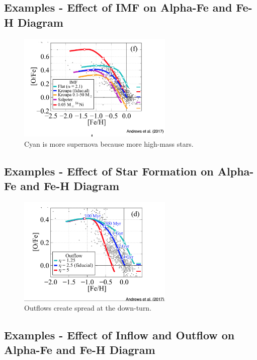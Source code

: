 \documentclass{article}
\begin{document}
\subsection{Examples - Effect of IMF on Alpha-Fe and Fe-H Diagram}

\begin{figure}
    \centering
    \includegraphics[width=0.66\textwidth]{figs/Screen Shot 2021-10-13 at 10.03.33 AM.png}
    \caption{Cyan is more supernova because more high-mass stars.  }
    \label{fig:Examples1}
\end{figure}

\subsection{Examples - Effect of Star Formation on Alpha-Fe and Fe-H Diagram}

\begin{figure}
    \centering
    \includegraphics[width=0.66\textwidth]{figs/Screen Shot 2021-10-13 at 10.04.44 AM.png}
    \caption{Outflows create spread at the down-turn.   }
    \label{fig:Examples2}
\end{figure}

\subsection{Examples - Effect of Inflow and Outflow on Alpha-Fe and Fe-H Diagram}
\end{document}
